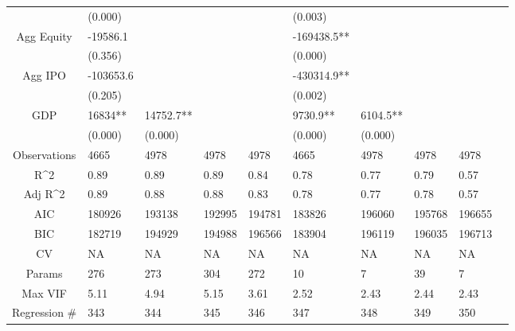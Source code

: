 \documentclass{article}
\begin{document}
\begin{table}[H]
\begin{tabular}{|clllllllll|}
   & (0.000) &  &  &  & (0.003) &  &  &  & \\ 
  Agg Equity & -19586.1 &  &  &  & -169438.5** &  &  &  & \\ 
   & (0.356) &  &  &  & (0.000) &  &  &  & \\ 
  Agg IPO & -103653.6 &  &  &  & -430314.9** &  &  &  & \\ 
   & (0.205) &  &  &  & (0.002) &  &  &  & \\ 
  GDP & 16834** & 14752.7** &  &  & 9730.9** & 6104.5** &  &  & \\ 
   & (0.000) & (0.000) &  &  & (0.000) & (0.000) &  &  & \\ 
  \hline 
 Observations & 4665 & 4978 & 4978 & 4978 & 4665 & 4978 & 4978 & 4978 & \\ 
  R^2 & 0.89 & 0.89 & 0.89 & 0.84 & 0.78 & 0.77 & 0.79 & 0.57 & \\ 
  Adj R^2 & 0.89 & 0.88 & 0.88 & 0.83 & 0.78 & 0.77 & 0.78 & 0.57 & \\ 
  AIC & 180926 & 193138 & 192995 & 194781 & 183826 & 196060 & 195768 & 196655 & \\ 
  BIC & 182719 & 194929 & 194988 & 196566 & 183904 & 196119 & 196035 & 196713 & \\ 
  CV & NA & NA & NA & NA & NA & NA & NA & NA & \\ 
  Params & 276 & 273 & 304 & 272 & 10 & 7 & 39 & 7 & \\ 
  Max VIF & 5.11 & 4.94 & 5.15 & 3.61 & 2.52 & 2.43 & 2.44 & 2.43 & \\ 
  Regression \# & 343 & 344 & 345 & 346 & 347 & 348 & 349 & 350 & \\ 
   \hline
\end{tabular}
 
\end{table}
\end{document}

